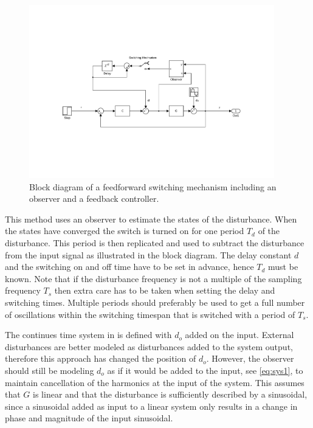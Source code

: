 \begin{figure}[h]
  \centering %
  \includegraphics[width=0.95\textwidth, trim=6cm 5.5cm 5.2cm 5.5cm, clip=true]{fig/matlab/ffrep}
  \caption{\label{fig:ffrep}Block diagram of a feedforward switching mechanism including an observer and a feedback controller.}
\end{figure}

This method uses an observer to estimate the states of the disturbance. When the states have converged the switch is turned on for one period $T_d$ of the disturbance. This period is then replicated and used to subtract the disturbance from the input signal as illustrated in the block diagram. The delay constant $d$ and the switching on and off time have to be set in advance, hence $T_d$ must be known. Note that if the disturbance frequency is not a multiple of the sampling frequency $T_s$ then extra care has to be taken when setting the delay and switching times. Multiple periods should preferably be used to get a full number of oscillations within the switching timespan that is switched with a period of $T_s$.

The continues time system in \citep{fujimoto2004repetitive} is defined with $d_o$ added on the input. External disturbances are better modeled as disturbances added to the system output, therefore this approach has changed the position of $d_o$. However, the observer should still be modeling $d_o$ as if it would be added to the input, see \eqref{eq:sys1}, to maintain cancellation of the harmonics at the input of the system. This assumes that $G$ is linear and that the disturbance is sufficiently described by a sinusoidal, since a sinusoidal added as input to a linear system only results in a change in phase and magnitude of the input sinusoidal.

